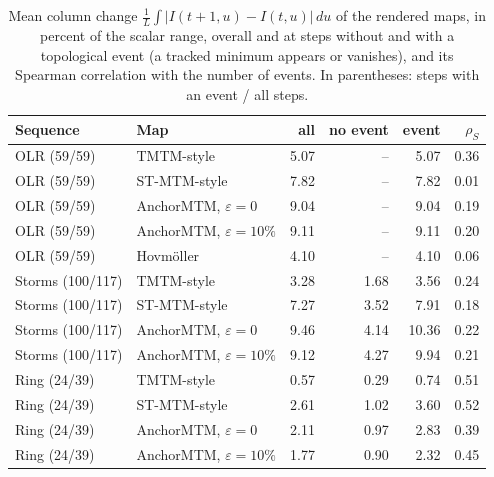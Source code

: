 \begin{table}[H]
\centering\small\setlength{\tabcolsep}{3.2pt}
\caption{Mean column change $\frac{1}{L}\int|I(t{+}1,u)-I(t,u)|\,du$ of the rendered maps, in percent of the scalar range, overall and at steps without and with a topological event (a tracked minimum appears or vanishes), and its Spearman correlation with the number of events. In parentheses: steps with an event / all steps.}\label{tab:supp_column_change}
\begin{tabular}{llrrrr}\toprule
Sequence & Map & all & no event & event & $\rho_S$\\\midrule
OLR (59/59) & TMTM-style & 5.07 & -- & 5.07 & 0.36\\
OLR (59/59) & ST-MTM-style & 7.82 & -- & 7.82 & 0.01\\
OLR (59/59) & AnchorMTM, $\varepsilon=0$ & 9.04 & -- & 9.04 & 0.19\\
OLR (59/59) & AnchorMTM, $\varepsilon=10\%$ & 9.11 & -- & 9.11 & 0.20\\
OLR (59/59) & Hovm\"oller & 4.10 & -- & 4.10 & 0.06\\
Storms (100/117) & TMTM-style & 3.28 & 1.68 & 3.56 & 0.24\\
Storms (100/117) & ST-MTM-style & 7.27 & 3.52 & 7.91 & 0.18\\
Storms (100/117) & AnchorMTM, $\varepsilon=0$ & 9.46 & 4.14 & 10.36 & 0.22\\
Storms (100/117) & AnchorMTM, $\varepsilon=10\%$ & 9.12 & 4.27 & 9.94 & 0.21\\
Ring (24/39) & TMTM-style & 0.57 & 0.29 & 0.74 & 0.51\\
Ring (24/39) & ST-MTM-style & 2.61 & 1.02 & 3.60 & 0.52\\
Ring (24/39) & AnchorMTM, $\varepsilon=0$ & 2.11 & 0.97 & 2.83 & 0.39\\
Ring (24/39) & AnchorMTM, $\varepsilon=10\%$ & 1.77 & 0.90 & 2.32 & 0.45\\
\bottomrule\end{tabular}
\end{table}
